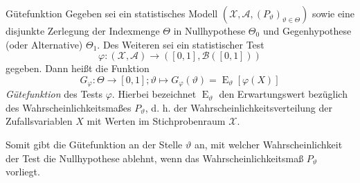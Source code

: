 \begin{defi}{Gütefunktion}
    Gegeben sei ein statistisches Modell $(\mathcal{X}, \mathcal{A}, (P_{\vartheta})_{\vartheta \in \Theta})$ sowie eine disjunkte Zerlegung der Indexmenge $\Theta$ in Nullhypothese $\Theta_0$ und Gegenhypothese (oder Alternative) $\Theta_1$.
    Des Weiteren sei ein statistischer Test
    \[
        \varphi: (\mathcal{X}, \mathcal{A}) \to ([0, 1], \mathcal{B}([0, 1]))
    \]
    gegeben.
    Dann heißt die Funktion
    \[
        G_{\varphi}: \Theta \to [0, 1]; \vartheta \mapsto G_{\varphi}(\vartheta) = \operatorname{E}_{\vartheta}[\varphi(X)]
    \]
    \emph{Gütefunktion} des Tests $\varphi$.
    Hierbei bezeichnet $\operatorname{E}_{\vartheta}$ den Erwartungswert bezüglich des Wahrscheinlichkeitsmaßes $P_{\vartheta}$, d. h. der Wahrscheinlichkeitsverteilung der Zufallsvariablen $X$ mit Werten im Stichprobenraum $\mathcal{X}$.

    Somit gibt die Gütefunktion an der Stelle $\vartheta$ an, mit welcher Wahrscheinlichkeit der Test die Nullhypothese ablehnt, wenn das Wahrscheinlichkeitsmaß $P_{\vartheta}$ vorliegt.
\end{defi}

